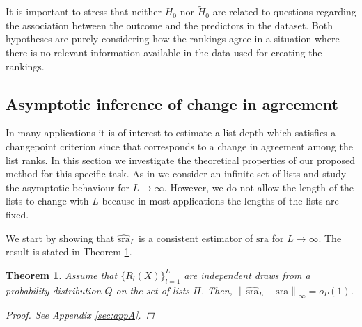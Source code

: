 \documentclass[12pt,a4paper]{article}
\DeclareMathOperator{\E}{\mathbb{E}}
\theoremstyle{plain}
\newtheorem{theorem}{Theorem}
\newtheorem{assumption}{Assumption}
\begin{document}
It is important to stress that neither $H_0$ nor $\widetilde H_0$ are
related to questions regarding the association between the outcome and
the predictors in the dataset. Both hypotheses are purely considering
how the rankings agree in a situation where there is no relevant
information available in the data used for creating the rankings.


\subsection{Asymptotic inference of change in agreement}\label{sec:chgpoint}
In many applications it is of interest to estimate a list depth which
satisfies a changepoint criterion since that corresponds to a change
in agreement among the list ranks. In this section we investigate the
theoretical properties of our proposed method for this specific
task. As in \cite{hall:schi:2012} we consider an infinite set
of lists and study the asymptotic behaviour for $L\to\infty$.
However, we do not allow the length of the lists to change with $L$
because in most applications the lengths of the lists are fixed.

We start by showing that $\widehat{\textrm{sra}}_L$ is a consistent
estimator of $\textrm{sra}$ for $L \rightarrow \infty$. The result is
stated in Theorem \ref{thm:consistency}.


\begin{theorem}
  Assume that $\{R_l(X)\}_{l=1}^L$ are independent draws from a
  probability distribution $Q$ on the set of lists $\Pi$. Then,
  $\left\|\widehat{\textrm{sra}}_L - \textrm{sra}\right\|_\infty =
  o_P(1)$.
\label{thm:consistency}
\begin{proof}
See Appendix \ref{sec:appA}.
\end{proof}
\end{theorem}
\end{document}
